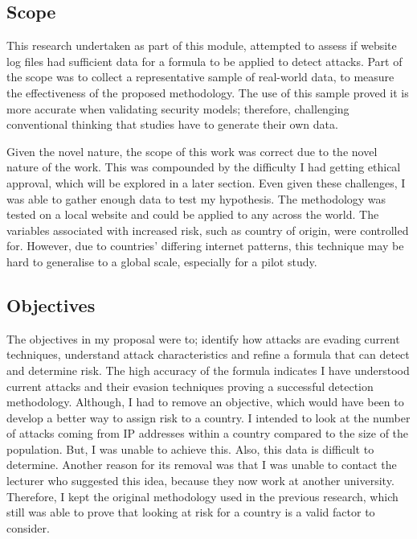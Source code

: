 \subsection{Scope}

This research undertaken as part of this module, attempted to assess if website log files had sufficient data for a formula to be applied to detect attacks. Part of the scope was to collect a representative sample of real-world data, to measure the effectiveness of the proposed methodology. The use of this sample proved it is more accurate when validating security models; therefore, challenging conventional thinking that studies have to generate their own data.

Given the novel nature, the scope of this work was correct due to the novel nature of the work. This was compounded by the difficulty I had getting ethical approval, which will be explored in a later section. Even given these challenges, I was able to gather enough data to test my hypothesis. The methodology was tested on a local website and could be applied to any across the world. The variables associated with increased risk, such as country of origin, were controlled for. However, due to countries' differing internet patterns, this technique may be hard to generalise to a global scale, especially for a pilot study.



\subsection{Objectives}

The objectives in my proposal were to; identify how attacks are evading current techniques, understand attack characteristics and refine a formula that can detect and determine risk. The high accuracy of the formula indicates I have understood current attacks and their evasion techniques proving a successful detection methodology. Although, I had to remove an objective, which would have been to develop a better way to assign risk to a country. I intended to look at the number of attacks coming from IP addresses within a country compared to the size of the population. But, I was unable to achieve this. Also, this data is difficult to determine. Another reason for its removal was that I was unable to contact the lecturer who suggested this idea, because they now work at another university. Therefore, I kept the original methodology used in the previous research, which still was able to prove that looking at risk for a country is a valid factor to consider.

